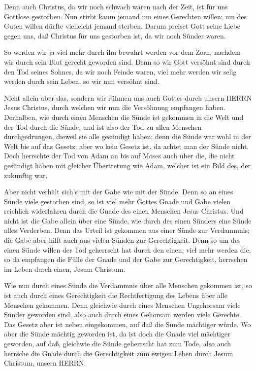  Denn auch Christus, da wir noch schwach waren nach der
Zeit, ist für uns Gottlose gestorben.  Nun stirbt kaum
jemand um eines Gerechten willen; um des Guten willen dürfte vielleicht
jemand sterben.  Darum preiset Gott seine Liebe gegen uns,
daß Christus für uns gestorben ist, da wir noch Sünder waren.

 So werden wir ja viel mehr durch ihn bewahrt werden vor dem
Zorn, nachdem wir durch sein Blut gerecht geworden sind. 
Denn so wir Gott versöhnt sind durch den Tod seines Sohnes, da wir noch
Feinde waren, viel mehr werden wir selig werden durch sein Leben, so wir
nun versöhnt sind.

 Nicht allein aber das, sondern wir rühmen uns auch Gottes
durch unsern HERRN Jesus Christus, durch welchen wir nun die Versöhnung
empfangen haben.  Derhalben, wie durch einen Menschen die
Sünde ist gekommen in die Welt und der Tod durch die Sünde, und ist also
der Tod zu allen Menschen durchgedrungen, dieweil sie alle gesündigt
haben;  denn die Sünde war wohl in der Welt bis auf das
Gesetz; aber wo kein Gesetz ist, da achtet man der Sünde nicht.
 Doch herrschte der Tod von Adam an bis auf Moses auch über
die, die nicht gesündigt haben mit gleicher Übertretung wie Adam,
welcher ist ein Bild des, der zukünftig war.

 Aber nicht verhält sich's mit der Gabe wie mit der Sünde.
Denn so an eines Sünde viele gestorben sind, so ist viel mehr Gottes
Gnade und Gabe vielen reichlich widerfahren durch die Gnade des einen
Menschen Jesus Christus.  Und nicht ist die Gabe allein
über eine Sünde, wie durch des einen Sünders eine Sünde alles Verderben.
Denn das Urteil ist gekommen aus einer Sünde zur Verdammnis; die Gabe
aber hilft auch aus vielen Sünden zur Gerechtigkeit.  Denn
so um des einen Sünde willen der Tod geherrscht hat durch den einen,
viel mehr werden die, so da empfangen die Fülle der Gnade und der Gabe
zur Gerechtigkeit, herrschen im Leben durch einen, Jesum Christum.

 Wie nun durch eines Sünde die Verdammnis über alle
Menschen gekommen ist, so ist auch durch eines Gerechtigkeit die
Rechtfertigung des Lebens über alle Menschen gekommen. 
Denn gleichwie durch eines Menschen Ungehorsam viele Sünder geworden
sind, also auch durch eines Gehorsam werden viele Gerechte.
 Das Gesetz aber ist neben eingekommen, auf daß die Sünde
mächtiger würde. Wo aber die Sünde mächtig geworden ist, da ist doch die
Gnade viel mächtiger geworden,  auf daß, gleichwie die
Sünde geherrscht hat zum Tode, also auch herrsche die Gnade durch die
Gerechtigkeit zum ewigen Leben durch Jesum Christum, unsern HERRN.


